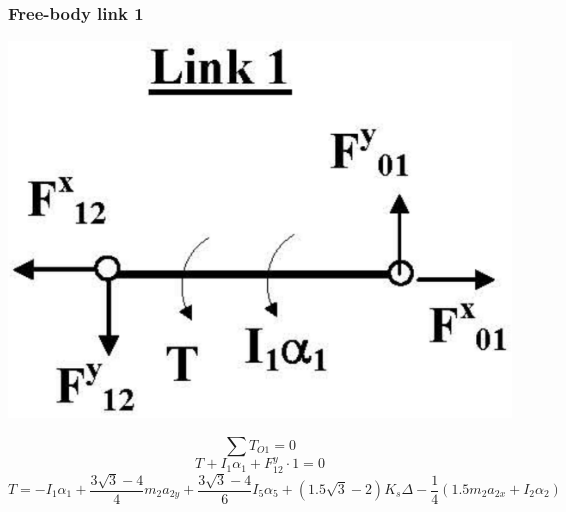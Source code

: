 \documentclass[11pt]{article}
\begin{document}
\subsubsection{Free-body link 1}
\label{sec:org160ac5a}
\begin{center}
\includegraphics[width=.9\linewidth]{./images/dynamic-force-analysis-example-3-link-1-free-body-diagram.png}
\end{center}

\[\sum T_{O1} = 0\]
\[T + I_1 \alpha_1 + F_{12}^y \cdot 1 = 0\]
\[T = - I_1 \alpha_1 + \frac{3 \sqrt{3} - 4}{4} m_2 a_{2y} + \frac{3 \sqrt{3} - 4}{6} I_5 \alpha_5 + (1.5 \sqrt{3} - 2) K_s \Delta - \frac{1}{4} (1.5 m_2 a_{2x} + I_2 \alpha_2)\]
\end{document}
